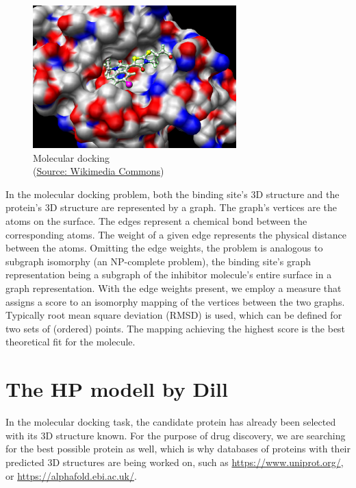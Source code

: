 \begin{figure}[H]
    \centering
    \includegraphics[width=0.7\textwidth]{figures/bioinformatics/molecular_docking.jpg}
    \caption{Molecular docking \\(\href{https://commons.wikimedia.org/wiki/File:Docking.jpg}{Source: Wikimedia Commons})}
\end{figure}

In the molecular docking problem, both the binding site's 3D structure and the protein's 3D structure are represented by a graph. The graph's vertices are the atoms on the surface. The edges represent a chemical bond between the corresponding atoms. The weight of a given edge represents the physical distance between the atoms. Omitting the edge weights, the problem is analogous to subgraph isomorphy (an NP-complete problem), the binding site's graph representation being a subgraph of the inhibitor molecule's entire surface in a graph representation. With the edge weights present, we employ a measure that assigns a score to an isomorphy mapping of the vertices between the two graphs. Typically root mean square deviation (RMSD) is used, which can be defined for two sets of (ordered) points. The mapping achieving the highest score is the best theoretical fit for the molecule.
 \cite{wang_protein_2021}
 
\section{The HP modell by Dill}

In the molecular docking task, the candidate protein has already been selected with its 3D structure known. For the purpose of drug discovery, we are searching for the best possible protein as well, which is why databases of proteins with their predicted 3D structures are being worked on, such as \href{https://www.uniprot.org/}{https://www.uniprot.org/}, or \href{https://alphafold.ebi.ac.uk/}{https://alphafold.ebi.ac.uk/}. \cite{senior_improved_2020}

